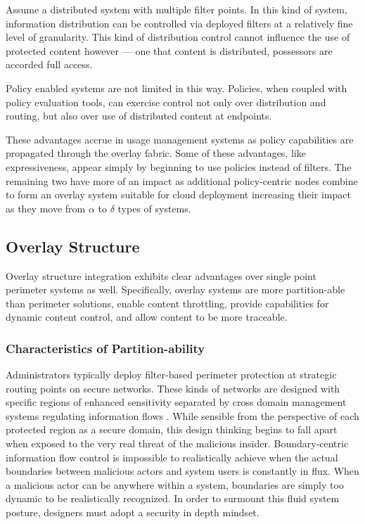 Assume a distributed system with multiple filter points.  In this kind of system, information distribution can be controlled via deployed filters at a relatively fine level of granularity.  This kind of distribution control cannot influence the use of protected content however --- one that content is distributed, possessors are accorded full access.

Policy enabled systems are not limited in this way.  Policies, when coupled with policy evaluation tools, can exercise control not only over distribution and routing, but also over use of distributed content at endpoints.

These advantages accrue in usage management systems as policy capabilities are propagated through the overlay fabric.  Some of these advantages, like expressiveness, appear simply by beginning to use policies instead of filters.  The remaining two have more of an impact as additional policy-centric nodes combine to form an overlay system suitable for cloud deployment increasing their impact as they move from $\alpha$ to $\delta$ types of systems.

\subsection{Overlay Structure}
Overlay structure integration exhibits clear advantages over single point perimeter systems as well.  Specifically, overlay systems are more partition-able than perimeter solutions, enable content throttling, provide capabilities for dynamic content control, and allow content to be more traceable.

\subsubsection*{Characteristics of Partition-ability}
Administrators typically deploy filter-based perimeter protection at strategic routing points on secure networks.  These kinds of networks are designed with specific regions of enhanced sensitivity separated by cross domain management systems regulating information flows \cite{proposal:nsa-arch,proposal:raytheon-arch,proposal:bah-arch}.  While sensible from the perspective of each protected region as a secure domain, this design thinking begins to fall apart when exposed to the very real threat of the malicious insider.  Boundary-centric information flow control is impossible to realistically achieve when the actual boundaries between malicious actors and system users is constantly in flux.  When a malicious actor can be anywhere within a system, boundaries are simply too dynamic to be realistically recognized.  In order to surmount this fluid system posture, designers must adopt a security in depth mindset.

